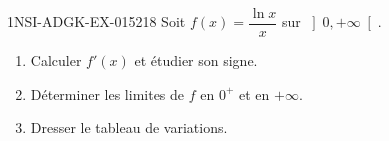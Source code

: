 \begin{exercice}{1NSI-ADGK-EX-015}{2}{18}
Soit $f(x) = \dfrac{\ln x}{x}$ sur $\left]0, +\infty\right[$.
\begin{enumerate}
  \item Calculer $f'(x)$ et étudier son signe.
  \item Déterminer les limites de $f$ en $0^+$ et en $+\infty$.
  \item Dresser le tableau de variations.
\end{enumerate}

\end{exercice}

